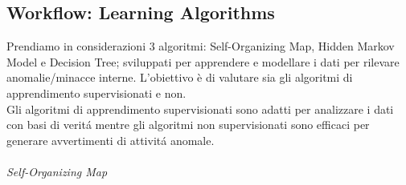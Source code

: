 \documentclass[../tesi.tex]{subfiles}
\begin{document}
\subsection{Workflow: Learning Algorithms}

Prendiamo in considerazioni 3 algoritmi: Self-Organizing Map, Hidden Markov Model e Decision Tree; sviluppati per apprendere e modellare i dati per rilevare anomalie/minacce interne. L’obiettivo è di valutare sia gli algoritmi di apprendimento supervisionati e non.\\
Gli algoritmi di apprendimento supervisionati sono adatti per analizzare i dati con basi di veritá mentre gli algoritmi non supervisionati sono efficaci per generare avvertimenti di attivitá anomale.\\
\\
\textit{Self-Organizing Map}\\
\\

\end{document}
